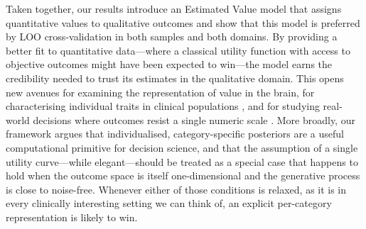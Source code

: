 \documentclass[11pt]{article}
\begin{document}
Taken together, our results introduce an Estimated Value model that assigns quantitative values to qualitative outcomes and show that this model is preferred by LOO cross-validation in both samples and both domains. By providing a better fit to quantitative data---where a classical utility function with access to objective outcomes might have been expected to win---the model earns the credibility needed to trust its estimates in the qualitative domain. This opens new avenues for examining the representation of value in the brain, for characterising individual traits in clinical populations \citep{ruderman2016ptsd,voon2015bed}, and for studying real-world decisions where outcomes resist a single numeric scale \citep{yeh2015dense,james2017prostate,basu2018vio}. More broadly, our framework argues that individualised, category-specific posteriors are a useful computational primitive for decision science, and that the assumption of a single utility curve---while elegant---should be treated as a special case that happens to hold when the outcome space is itself one-dimensional and the generative process is close to noise-free. Whenever either of those conditions is relaxed, as it is in every clinically interesting setting we can think of, an explicit per-category representation is likely to win.


\end{document}
